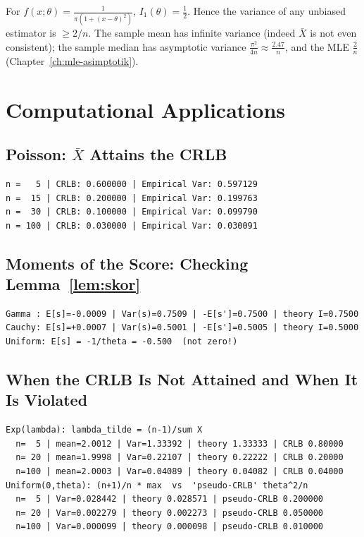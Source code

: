 \documentclass[main.tex]{subfiles}
\begin{document}
\begin{example}
For $f(x;\theta)=\frac{1}{\pi(1+(x-\theta)^2)}$, $I_1(\theta)=\frac12$. Hence the variance of any unbiased estimator is $\ge2/n$. The sample mean has infinite variance (indeed $\bar X$ is not even consistent); the sample median has asymptotic variance $\frac{\pi^2}{4n}\approx\frac{2.47}{n}$, and the MLE $\frac2n$ (Chapter~\ref{ch:mle-asimptotik}).
\end{example}

\section{Computational Applications}

\subsection{Poisson: $\bar X$ Attains the CRLB}

\begin{lstlisting}[style=output]
n =   5 | CRLB: 0.600000 | Empirical Var: 0.597129
n =  15 | CRLB: 0.200000 | Empirical Var: 0.199763
n =  30 | CRLB: 0.100000 | Empirical Var: 0.099790
n = 100 | CRLB: 0.030000 | Empirical Var: 0.030091
\end{lstlisting}

\subsection{Moments of the Score: Checking Lemma~\ref{lem:skor}}

\begin{lstlisting}[style=output]
Gamma : E[s]=-0.0009 | Var(s)=0.7509 | -E[s']=0.7500 | theory I=0.7500
Cauchy: E[s]=+0.0007 | Var(s)=0.5001 | -E[s']=0.5005 | theory I=0.5000
Uniform: E[s] = -1/theta = -0.500  (not zero!)
\end{lstlisting}

\subsection{When the CRLB Is Not Attained and When It Is Violated}

\begin{lstlisting}[style=output]
Exp(lambda): lambda_tilde = (n-1)/sum X
  n=  5 | mean=2.0012 | Var=1.33392 | theory 1.33333 | CRLB 0.80000
  n= 20 | mean=1.9998 | Var=0.22107 | theory 0.22222 | CRLB 0.20000
  n=100 | mean=2.0003 | Var=0.04089 | theory 0.04082 | CRLB 0.04000
Uniform(0,theta): (n+1)/n * max  vs  'pseudo-CRLB' theta^2/n
  n=  5 | Var=0.028442 | theory 0.028571 | pseudo-CRLB 0.200000
  n= 20 | Var=0.002279 | theory 0.002273 | pseudo-CRLB 0.050000
  n=100 | Var=0.000099 | theory 0.000098 | pseudo-CRLB 0.010000
\end{lstlisting}
\end{document}

